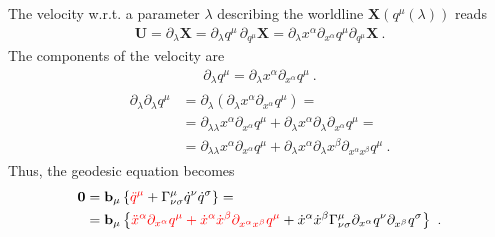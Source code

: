 \documentclass[letterpaper,10pt,english]{jupyterBook}
\begin{document}
\sphinxAtStartPar
{} The velocity w.r.t. a parameter \(\lambda\) describing the worldline \(\mathbf{X}\left(q^{\mu}(\lambda)\right)\) reads
\begin{equation*}
\begin{split}\mathbf{U} = \partial_{\lambda} \mathbf{X} = \partial_{\lambda} q^{\mu} \, \partial_{q^{\mu}} \mathbf{X} = \partial_{\lambda} x^{\alpha} \partial_{x^{\alpha}} q^{\mu} \partial_{q^{\mu}} \mathbf{X} \ .\end{split}
\end{equation*}
\sphinxAtStartPar
The components of the velocity are
\begin{equation*}
\begin{split}\partial_{\lambda} q^{\mu}  = \partial_{\lambda} x^{\alpha} \partial_{x^{\alpha}} q^{\mu} \ .\end{split}
\end{equation*}
\sphinxAtStartPar
{}
\begin{equation*}
\begin{split}\begin{aligned}
  \partial_{\lambda} \partial_{\lambda} q^{\mu}
  & = \partial_{\lambda} \left( \partial_{\lambda} x^{\alpha} \partial_{x^\alpha} q^{\mu} \right) = \\
  & = \partial_{\lambda \lambda} x^{\alpha} \partial_{x^\alpha} q^{\mu} + \partial_\lambda x^{\alpha} \partial_{\lambda} \partial_{x^\alpha} q^{\mu} = \\
  & = \partial_{\lambda \lambda} x^{\alpha} \partial_{x^\alpha} q^{\mu} + \partial_\lambda x^{\alpha} \partial_{\lambda} x^\beta \partial_{x^\alpha x^\beta} q^{\mu} \ .
\end{aligned}\end{split}
\end{equation*}
\sphinxAtStartPar
Thus, the geodesic equation becomes
\begin{equation*}
\begin{split}\begin{aligned}
  \mathbf{0}
  & = \mathbf{b}_\mu \left\{ {\color{red} \ddot{q}^{\mu}} + \Gamma_{\nu \sigma}^{\mu} \dot{q}^{\nu} \dot{q}^{\sigma} \right\} = \\
  & = \mathbf{b}_\mu \left\{ {\color{red} \ddot{x}^{\alpha} \partial_{x^\alpha} q^{\mu} + \dot{x}^\alpha \dot{x}^\beta \partial_{x^\alpha x^\beta} q^{\mu}} + \dot{x}^\alpha \dot{x}^\beta \Gamma_{\nu \sigma}^{\mu} \partial_{x^\alpha} q^{\nu} \partial_{x^\beta} q^{\sigma} \right\} \ .
\end{aligned}\end{split}
\end{equation*}
\end{document}
